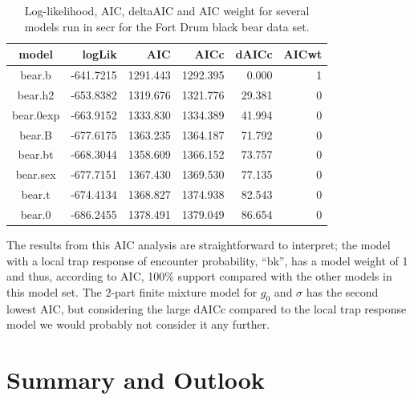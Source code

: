 \begin{table}[ht]
\centering
\caption{Log-likelihood, AIC, deltaAIC and AIC weight for several models run in secr for the Fort Drum black bear data set.}
\begin{tabular}{crrrrr}
\hline \hline
model     &  logLik   &   AIC    &   AICc   & dAICc  & AICwt \\ \hline
bear.b    & -641.7215 & 1291.443 & 1292.395 & 0.000  &  1 \\
bear.h2   & -653.8382 & 1319.676 & 1321.776 & 29.381 &  0 \\
bear.0exp & -663.9152 & 1333.830 & 1334.389 & 41.994 &  0 \\
bear.B    & -677.6175 & 1363.235 & 1364.187 & 71.792 &  0 \\
bear.bt   & -668.3044 & 1358.609 & 1366.152 & 73.757 &  0 \\
bear.sex  & -677.7151 & 1367.430 & 1369.530 & 77.135 &  0 \\
bear.t    & -674.4134 & 1368.827 & 1374.938 & 82.543 &  0 \\
bear.0    & -686.2455 & 1378.491 & 1379.049 & 86.654 &  0 \\ \hline
\end{tabular}
\label{covariates.tab.secrAIC}
\end{table}


The results from this AIC analysis are straightforward to interpret; the model
with a local trap response of encounter probability, ``bk'', 
has a model weight of 1 and thus, according to AIC, 100\% support compared with the other
models in this model set.
The 2-part finite mixture model for $g_0$ and $\sigma$ has the second lowest
AIC, but considering the large dAICc compared to the local trap response model we would probably not consider it any further.  


\section{Summary and Outlook}

